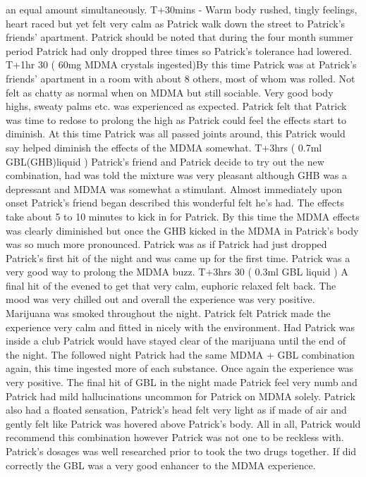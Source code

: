 \documentclass[12pt]{book}
\begin{document}
an equal amount simultaneously. T+30mins - Warm body rushed, tingly feelings, heart raced but yet felt very calm as Patrick walk down the street to Patrick's friends' apartment. Patrick should be noted that during the four month summer period Patrick had only dropped three times so Patrick's tolerance had lowered. T+1hr 30 ( 60mg MDMA crystals ingested)By this time Patrick was at Patrick's friends' apartment in a room with about 8 others, most of whom was rolled. Not felt as chatty as normal when on MDMA but still sociable. Very good body highs, sweaty palms etc. was experienced as expected. Patrick felt that Patrick was time to redose to prolong the high as Patrick could feel the effects start to diminish. At this time Patrick was all passed joints around, this Patrick would say helped diminish the effects of the MDMA somewhat. T+3hrs ( 0.7ml GBL(GHB)liquid ) Patrick's friend and Patrick decide to try out the new combination, had was told the mixture was very pleasant although GHB was a depressant and MDMA was somewhat a stimulant. Almost immediately upon onset Patrick's friend began described this wonderful felt he's had. The effects take about 5 to 10 minutes to kick in for Patrick. By this time the MDMA effects was clearly diminished but once the GHB kicked in the MDMA in Patrick's body was so much more pronounced. Patrick was as if Patrick had just dropped Patrick's first hit of the night and was came up for the first time. Patrick was a very good way to prolong the MDMA buzz. T+3hrs 30 ( 0.3ml GBL liquid ) A final hit of the evened to get that very calm, euphoric relaxed felt back. The mood was very chilled out and overall the experience was very positive. Marijuana was smoked throughout the night. Patrick felt Patrick made the experience very calm and fitted in nicely with the environment. Had Patrick was inside a club Patrick would have stayed clear of the marijuana until the end of the night. The followed night Patrick had the same MDMA + GBL combination again, this time ingested more of each substance. Once again the experience was very positive. The final hit of GBL in the night made Patrick feel very numb and Patrick had mild hallucinations uncommon for Patrick on MDMA solely. Patrick also had a floated sensation, Patrick's head felt very light as if made of air and gently felt like Patrick was hovered above Patrick's body. All in all, Patrick would recommend this combination however Patrick was not one to be reckless with. Patrick's dosages was well researched prior to took the two drugs together. If did correctly the GBL was a very good enhancer to the MDMA experience.
\end{document}
